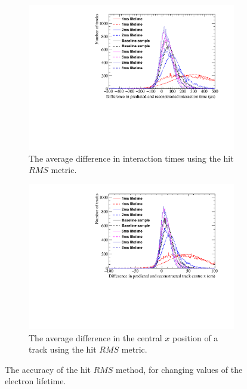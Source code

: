 \begin{figure}[h!]
  \centering
  \begin{subfigure}{0.6\textwidth}
    \centering
    \includegraphics[width=\textwidth]{Canvas_AvDiff_T_RMS_ElecLifetime}
    \caption{The average difference in interaction times using the hit $RMS$ metric.}
    \label{fig:DiffLifeStudy_AvDiffRMS_T}
  \end{subfigure}
  \begin{subfigure}{0.6\textwidth}
    \centering
    \includegraphics[width=\textwidth]{Canvas_AvDiff_X_RMS_ElecLifetime}
    \caption{The average difference in the central $x$ position of a track using the hit $RMS$ metric.}
    \label{fig:DiffLifeStudy_AvDiffRMS_X}
  \end{subfigure}
  \caption[Comparing the accuracy of the hit $RMS$ method, as the electron lifetime changes]
          {The accuracy of the hit $RMS$ method, for changing values of the electron lifetime. }
  \label{fig:DiffLifeStudy_AvDiff_RMS}
\end{figure}

